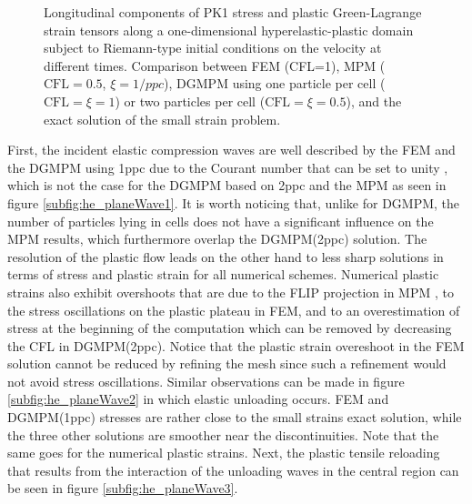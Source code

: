 \begin{figure}[h!]
  \centering
  {}
  {}
  {}
  
  \caption{Longitudinal components of PK1 stress and plastic Green-Lagrange strain tensors along a one-dimensional hyperelastic-plastic domain subject to Riemann-type initial conditions on the velocity at different times. Comparison between FEM (CFL=1), MPM ($\text{CFL}=0.5$, $\xi=1/ppc$), DGMPM using one particle per cell ($\text{CFL}=\xi=1$) or two particles per cell ($\text{CFL}=\xi=0.5$), and the exact solution of the small strain problem.}
  \label{fig:hep_planeWave}
\end{figure}
First, the incident elastic compression waves are well described by the FEM and the DGMPM using 1ppc due to the Courant number that can be set to unity \cite{DGMPM}, which is not the case for the DGMPM based on 2ppc and the MPM as seen in figure \ref{subfig:he_planeWave1}.
It is worth noticing that, unlike for DGMPM, the number of particles lying in cells does not have a significant influence on the MPM results, which furthermore overlap the DGMPM(2ppc) solution.
The resolution of the plastic flow leads on the other hand to less sharp solutions in terms of stress and plastic strain for all numerical schemes.
Numerical plastic strains also exhibit overshoots that are due to the FLIP projection in MPM \cite{Thesis}, to the stress oscillations on the plastic plateau in FEM, and to an overestimation of stress at the beginning of the computation which can be removed by decreasing the CFL in DGMPM(2ppc).
Notice that the plastic strain overeshoot in the FEM solution cannot be reduced by refining the mesh since such a refinement would not avoid stress oscillations.
Similar observations can be made in figure \ref{subfig:he_planeWave2} in which elastic unloading occurs.
FEM and DGMPM(1ppc) stresses are rather close to the small strains exact solution, while the three other solutions are smoother near the discontinuities.
Note that the same goes for the numerical plastic strains.
Next, the plastic tensile reloading that results from the interaction of the unloading waves in the central region can be seen in figure \ref{subfig:he_planeWave3}.
